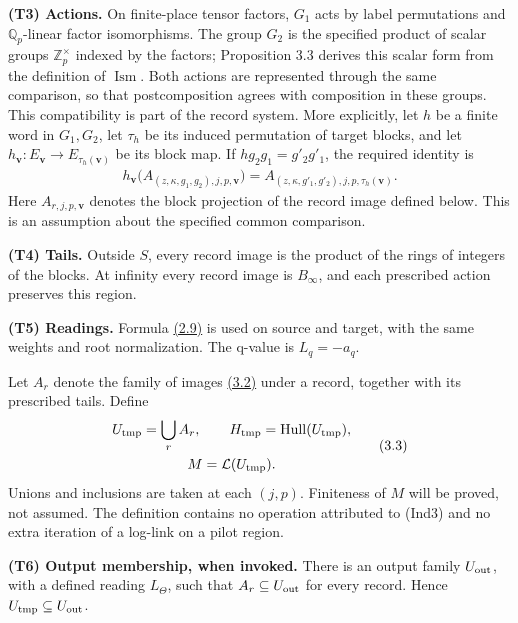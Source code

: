 \documentclass[11pt,a4paper]{amsart}
\begin{document}
\textbf{(T3) Actions.} On finite-place tensor factors, $G_1$ acts by label permutations and $\mathbb Q_p$-linear factor isomorphisms. The group $G_2$ is the specified product of scalar groups $\mathbb Z_p^\times$ indexed by the factors; Proposition 3.3 derives this scalar form from the definition of $\operatorname{Ism}$. Both actions are represented through the same comparison, so that postcomposition agrees with composition in these groups. This compatibility is part of the record system. More explicitly, let $h$ be a finite word in $G_1,G_2$, let $\tau_h$ be its induced permutation of target blocks, and let $h_{\mathbf v}:E_{\mathbf v}\longrightarrow E_{\tau_h(\mathbf v)}$ be its block map. If $hg_2g_1=g'_2g'_1$, the required identity is
\begin{equation}
\begin{gathered}
h_{\mathbf v}\bigl(A_{(z,\kappa,g_1,g_2),j,p,\mathbf v}\bigr)
=A_{(z,\kappa,g'_1,g'_2),j,p,\tau_h(\mathbf v)}.
\end{gathered}
\tag{3.1a}\label{eq:3.1a}
\end{equation}
Here $A_{r,j,p,\mathbf v}$ denotes the block projection of the record image defined below. This is an assumption about the specified common comparison.


\textbf{(T4) Tails.} Outside $S$, every record image is the product of the rings of integers of the blocks. At infinity every record image is $B_\infty$, and each prescribed action preserves this region.


\textbf{(T5) Readings.} Formula \hyperref[eq:2.9]{(2.9)} is used on source and target, with the same weights and root normalization. The q-value is $L_q=-a_q$.


Let $A_r$ denote the family of images \hyperref[eq:3.2]{(3.2)} under a record, together with its prescribed tails. Define
\begin{equation}
\begin{gathered}
U_{\rm tmp}=\bigcup_r A_r,\qquad H_{\rm tmp}=\operatorname{Hull}(U_{\rm tmp}),\\ M=\mathcal L(U_{\rm tmp}).
\end{gathered}
\tag{3.3}\label{eq:3.3}
\end{equation}
Unions and inclusions are taken at each $(j,p)$. Finiteness of $M$ will be proved, not assumed. The definition contains no operation attributed to (Ind3) and no extra iteration of a log-link on a pilot region.


\textbf{(T6) Output membership, when invoked.} There is an output family $U_{\rm out}$, with a defined reading $L_\Theta$, such that $A_r\subseteq U_{\rm out}$ for every record. Hence $U_{\rm tmp}\subseteq U_{\rm out}$.
\end{document}
